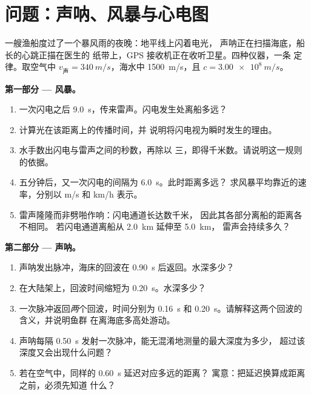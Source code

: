\section{问题：声呐、风暴与心电图}

\begin{problem}[{周末问题 --- 读懂世界的信号：一条
定律，$d = v\,t$，用来测定风暴距离、绘制海床、计数心跳，并
探究 GPS 的工作原理}]
\label{pb:g10:signals-and-waves:1}
一艘渔船度过了一个暴风雨的夜晚：地平线上闪着电光，
声呐正在扫描海底，船长的心跳正描在医生的
纸带上，GPS 接收机正在收听卫星。四种仪器，一条
定律。取空气中 $v_{\text{声}} = \qty{340}{m/s}$，海水中
\qty{1500}{m/s}，且 $c = \qty{3.00e8}{m/s}$。

\medskip
\noindent\textbf{第一部分 --- 风暴。}
\begin{enumerate}
  \item 一次闪电之后 \qty{9.0}{s}，传来雷声。闪电发生处离船多远？
  \item 计算光在该距离上的传播时间，并
        说明将闪电视为瞬时发生的理由。
  \item 水手数出闪电与雷声之间的秒数，再除以
        三，即得千米数。请说明这一规则的依据。
  \item 五分钟后，又一次闪电的间隔为 \qty{6.0}{s}。此时距离多远？
        求风暴平均靠近的速率，分别以 \unit{m/s} 和 \unit{km/h} 表示。
  \item 雷声隆隆而非劈啪作响：闪电通道长达数千米，
        因此其各部分离船的距离各不相同。
        若闪电通道离船从 \qty{2.0}{km} 延伸至 \qty{5.0}{km}，
        雷声会持续多久？
\end{enumerate}

\medskip
\noindent\textbf{第二部分 --- 声呐。}
\begin{enumerate}[resume]
  \item 声呐发出脉冲，海床的回波在 \qty{0.90}{s} 后返回。水深多少？
  \item 在大陆架上，回波时间缩短为 \qty{0.20}{s}。水深多少？
  \item 一次脉冲返回\emph{两}个回波，时间分别为 \qty{0.16}{s} 和
        \qty{0.20}{s}。请解释这两个回波的含义，并说明鱼群
        在离海底多高处游动。
  \item 声呐每隔 \qty{0.50}{s} 发射一次脉冲，能无混淆地测量的最大深度为多少，
        超过该深度又会出现什么问题？
  \item 若在空气中，同样的 \qty{0.60}{s} 延迟对应多远的距离？
        寓意：把延迟换算成距离之前，必须先知道
        什么？
\end{enumerate}


\end{problem}
